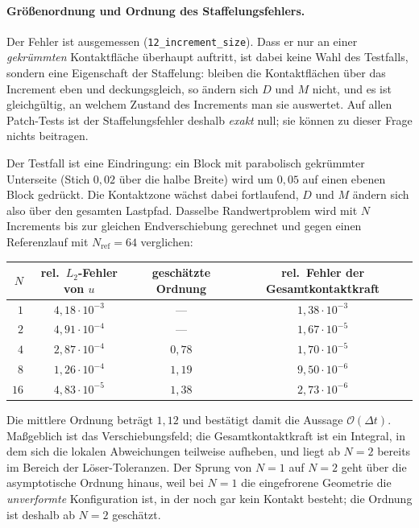 \documentclass[a4paper,11pt]{article}
\def\bm#1{#1}%
\newcommand{\file}[1]{\texttt{\small #1}}
\begin{document}
\paragraph{Größenordnung und Ordnung des Staffelungsfehlers.}
\label{sec:staffelordnung}
Der Fehler ist ausgemessen (\file{12\_increment\_size}). Dass er nur an einer \emph{gekrümmten}
Kontaktfläche überhaupt auftritt, ist dabei keine Wahl des Testfalls, sondern eine Eigenschaft der
Staffelung: bleiben die Kontaktflächen über das Increment eben und deckungsgleich, so ändern sich
$\bm D$ und $\bm M$ nicht, und es ist gleichgültig, an welchem Zustand des Increments man sie
auswertet. Auf allen Patch-Tests ist der Staffelungsfehler deshalb \emph{exakt} null; sie können
zu dieser Frage nichts beitragen.

Der Testfall ist eine Eindringung: ein Block mit parabolisch gekrümmter Unterseite (Stich $0{,}02$
über die halbe Breite) wird um $0{,}05$ auf einen ebenen Block gedrückt. Die Kontaktzone wächst
dabei fortlaufend, $\bm D$ und $\bm M$ ändern sich also über den gesamten Lastpfad. Dasselbe
Randwertproblem wird mit $N$ Increments bis zur gleichen Endverschiebung gerechnet und gegen
einen Referenzlauf mit $N_{\text{ref}}=64$ verglichen:

\begin{center}
\small
\begin{tabular}{rccc}
\toprule
$N$ & rel.\ $L_2$-Fehler von $\bm u$ & geschätzte Ordnung & rel.\ Fehler der Gesamtkontaktkraft \\
\midrule
$1$  & $4{,}18\cdot10^{-3}$ & ---      & $1{,}38\cdot10^{-3}$ \\
$2$  & $4{,}91\cdot10^{-4}$ & ---      & $1{,}67\cdot10^{-5}$ \\
$4$  & $2{,}87\cdot10^{-4}$ & $0{,}78$ & $1{,}70\cdot10^{-5}$ \\
$8$  & $1{,}26\cdot10^{-4}$ & $1{,}19$ & $9{,}50\cdot10^{-6}$ \\
$16$ & $4{,}83\cdot10^{-5}$ & $1{,}38$ & $2{,}73\cdot10^{-6}$ \\
\bottomrule
\end{tabular}
\end{center}

\noindent Die mittlere Ordnung beträgt $1{,}12$ und bestätigt damit die Aussage $\mathcal
O(\Delta t)$. Maßgeblich ist das Verschiebungsfeld; die Gesamtkontaktkraft ist ein Integral, in
dem sich die lokalen Abweichungen teilweise aufheben, und liegt ab $N=2$ bereits im Bereich der
Löser-Toleranzen. Der Sprung von $N=1$ auf $N=2$ geht über die asymptotische Ordnung hinaus, weil
bei $N=1$ die eingefrorene Geometrie die \emph{unverformte} Konfiguration ist, in der noch gar
kein Kontakt besteht; die Ordnung ist deshalb ab $N=2$ geschätzt.
\end{document}

